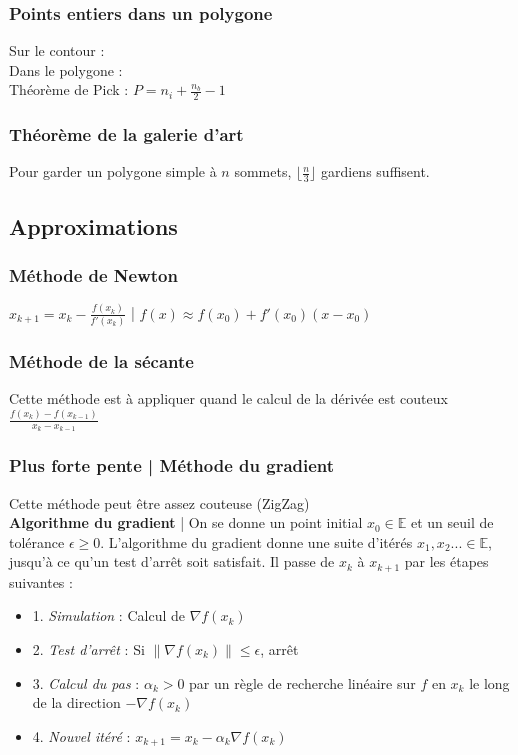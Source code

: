 \documentclass[8pt]{article}
\begin{document}
            \subsubsection{Points entiers dans un polygone}
                Sur le contour : \\
                Dans le polygone : \\
                Théorème de Pick :
                $P = n_{i} + \frac{n_{b}}{2}-1$
            \subsubsection{Théorème de la galerie d'art}
            Pour garder un polygone simple à $n$ sommets, $\lfloor \frac{n}{3} \rfloor$ gardiens suffisent.
        \subsection{Approximations}
            \subsubsection{Méthode de Newton}
            $x_{k+1} = x_{k} - \frac{f(x_{k})}{f'(x_{k})}$ | $f(x) \approx f(x_{0}) + f'(x_{0})(x-x_{0})$
            \subsubsection{Méthode de la sécante}
            Cette méthode est à appliquer quand le calcul de la dérivée est couteux
            $\frac{f(x_{k} )- f(x_{k-1})}{x_{k} - x_{k-1}}$
            \subsubsection{Plus forte pente | Méthode du gradient}
            Cette méthode peut être assez couteuse (ZigZag) \\
            \textbf{Algorithme du gradient} | On se donne un point initial $x_0 \in \mathbb{E}$ et un seuil de tolérance
            $\epsilon \geq 0$. L'algorithme du gradient donne une suite d'itérés $x_1 , x_2 ... \in \mathbb{E}$, jusqu'à ce qu'un test d'arrêt
            soit satisfait. Il passe de $x_k$ à $x_{k+1}$ par les étapes suivantes :
            \begin{itemize}
                \item 1. \textit{Simulation} : Calcul de $\nabla f(x_k)$
                \item 2. \textit{Test d'arrêt} : Si $\lVert \nabla f(x_k) \rVert \leq \epsilon$, arrêt 
                \item 3. \textit{Calcul du pas} : $\alpha_k > 0$ par un règle de recherche linéaire sur $f$ en $x_k$
                le long de la direction $-\nabla f(x_k)$
                \item 4. \textit{Nouvel itéré} : $x_{k+1} = x_k - \alpha_k \nabla f(x_k)$ 
            \end{itemize}
\end{document}
